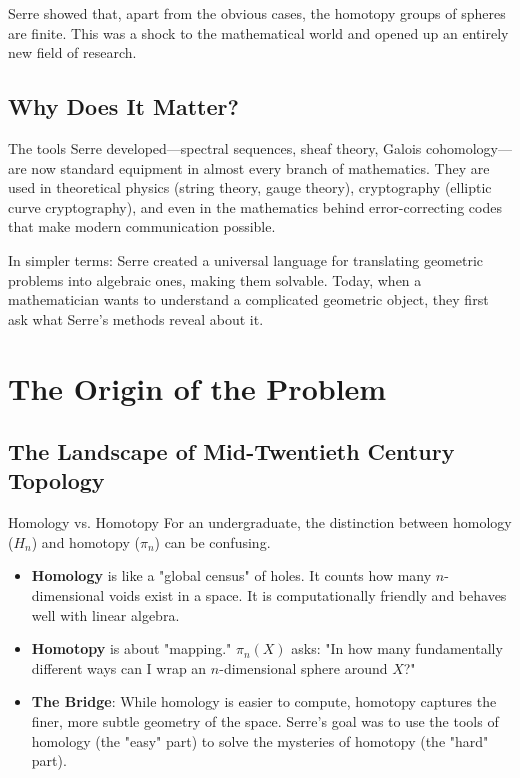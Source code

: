Serre showed that, apart from the obvious cases, the homotopy groups of spheres are finite. This was a shock to the mathematical world and opened up an entirely new field of research.

\subsection{Why Does It Matter?}

The tools Serre developed---spectral sequences, sheaf theory, Galois cohomology---are now standard equipment in almost every branch of mathematics. They are used in theoretical physics (string theory, gauge theory), cryptography (elliptic curve cryptography), and even in the mathematics behind error-correcting codes that make modern communication possible.

In simpler terms: Serre created a universal language for translating geometric problems into algebraic ones, making them solvable. Today, when a mathematician wants to understand a complicated geometric object, they first ask what Serre's methods reveal about it.

\section{The Origin of the Problem}

\subsection{The Landscape of Mid-Twentieth Century Topology}

\begin{knowledgebridge}{Homology vs. Homotopy}
For an undergraduate, the distinction between homology ($H_n$) and homotopy ($\pi_n$) can be confusing.
\begin{itemize}
    \item \textbf{Homology} is like a "global census" of holes. It counts how many $n$-dimensional voids exist in a space. It is computationally friendly and behaves well with linear algebra.
    \item \textbf{Homotopy} is about "mapping." $\pi_n(X)$ asks: "In how many fundamentally different ways can I wrap an $n$-dimensional sphere around $X$?"
    \item \textbf{The Bridge}: While homology is easier to compute, homotopy captures the finer, more subtle geometry of the space. Serre's goal was to use the tools of homology (the "easy" part) to solve the mysteries of homotopy (the "hard" part).
\end{itemize}
\end{knowledgebridge}

